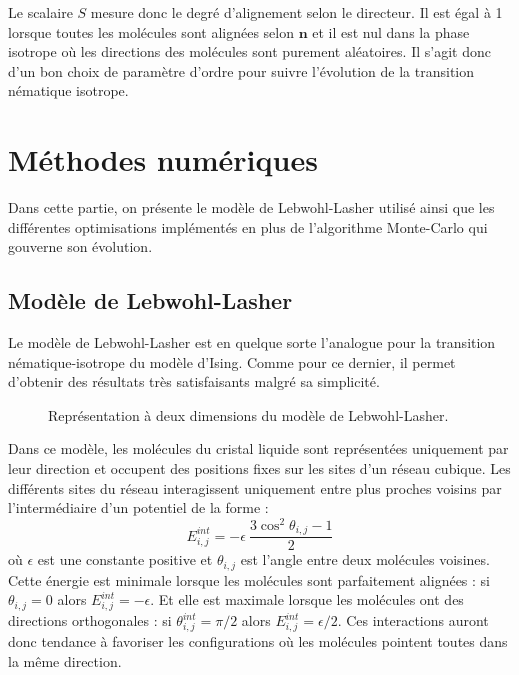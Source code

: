 \documentclass[11pt,a4paper]{article}
\numberwithin{equation}{section}
\begin{document}
Le scalaire $S$ mesure donc le degré d'alignement selon le directeur. Il est égal à 1 lorsque toutes les molécules sont alignées selon $\bm{n}$ et il est nul dans la phase isotrope où les directions des molécules sont purement aléatoires. Il s'agit donc d'un bon choix de paramètre d'ordre pour suivre l'évolution de la transition nématique isotrope.
\newpage
\section{Méthodes numériques}
Dans cette partie, on présente le modèle de Lebwohl-Lasher utilisé ainsi que les différentes optimisations implémentés en plus de l'algorithme Monte-Carlo qui gouverne son évolution.

\subsection{Modèle de Lebwohl-Lasher}
\label{lebwohlpart}
Le modèle de Lebwohl-Lasher \cite{model} est en quelque sorte l'analogue pour la transition nématique-isotrope du modèle d'Ising. Comme pour ce dernier, il permet d'obtenir des résultats très satisfaisants malgré sa simplicité.\medskip

\begin{figure}[h]
    \center
    
    \caption{Représentation à deux dimensions du modèle de Lebwohl-Lasher.}
    \label{lebwohl}
\end{figure}


Dans ce modèle, les molécules du cristal liquide sont représentées uniquement par leur direction et occupent des positions fixes sur les sites d'un réseau cubique.
Les différents sites du réseau interagissent uniquement entre plus proches voisins par l'intermédiaire d'un potentiel de la forme :
\begin{equation}
E_{i,j}^{int} = - \epsilon\ \frac{3\cos^2\theta_{i,j}-1}{2}
\label{interact}
\end{equation}
où $\epsilon$ est une constante positive et $\theta_{i,j}$ est l'angle entre deux molécules voisines. 
Cette énergie est minimale lorsque les molécules sont parfaitement alignées : si $\theta_{i,j} = 0$ alors $E_{i,j}^{int} = - \epsilon$. Et elle est maximale lorsque les molécules ont des directions orthogonales : si $\theta_{i,j}^{int} = \pi/2$ alors $E_{i,j}^{int} = \epsilon/2$.
Ces interactions auront donc tendance à favoriser les configurations où les molécules pointent toutes dans la même direction.\medskip
\end{document}
